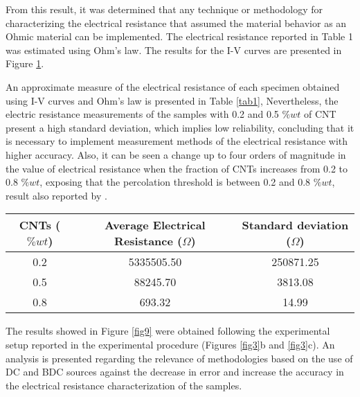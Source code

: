 \documentclass[twocolumn]{bmcart}%
\begin{document}
From this result, it was determined that any technique or methodology for characterizing the electrical resistance that assumed the material behavior as an Ohmic material can be implemented. The electrical resistance reported in Table 1 was estimated using Ohm's law. The results for the I-V curves are presented in Figure \ref{fig8}.

\begin{figure}[h!]
  \caption{
      }
      \label{fig8}
      \end{figure}
  

An approximate measure of the electrical resistance of each specimen obtained using  I-V curves and Ohm's law is presented in Table \ref{tab1}, Nevertheless, the electric resistance measurements of the samples with 0.2  and 0.5 $\%wt$ of CNT present a high standard deviation, which implies low reliability, concluding that it is necessary to implement measurement methods of the electrical resistance with higher accuracy. Also, it can be seen a change up to four orders of magnitude in the value of electrical resistance when the fraction of CNTs increases from 0.2  to 0.8 $\%wt$, exposing that the percolation threshold is between 0.2 and 0.8 $\%wt$, result also reported by \cite{Garcia-Macias2017}.

\begin{table*}[ht]
\caption{Electrical resistance values and their corresponding standard deviations obtained from the I-V curves characterization.}
\centering
\begin{tabular}{|c|c|c|}
\hline
\textbf{CNTs ($\% wt$)} & \textbf{Average Electrical Resistance ($\Omega$)} & \textbf{Standard deviation ($\Omega$)}\\
\hline
0.2 & 5335505.50 & 250871.25\\
\hline
0.5 & 88245.70 & 3813.08\\
\hline
0.8 & 693.32 & 14.99\\
\hline 

\end{tabular}
\label{tab1}
\end{table*}


The results showed in Figure \ref{fig9} were obtained following the experimental setup reported in the experimental procedure (Figures \ref{fig3}b and \ref{fig3}c). An analysis is presented regarding the relevance of methodologies based on the use of DC and BDC sources against the decrease in error and increase the accuracy in the electrical resistance characterization of the samples.
\end{document}
